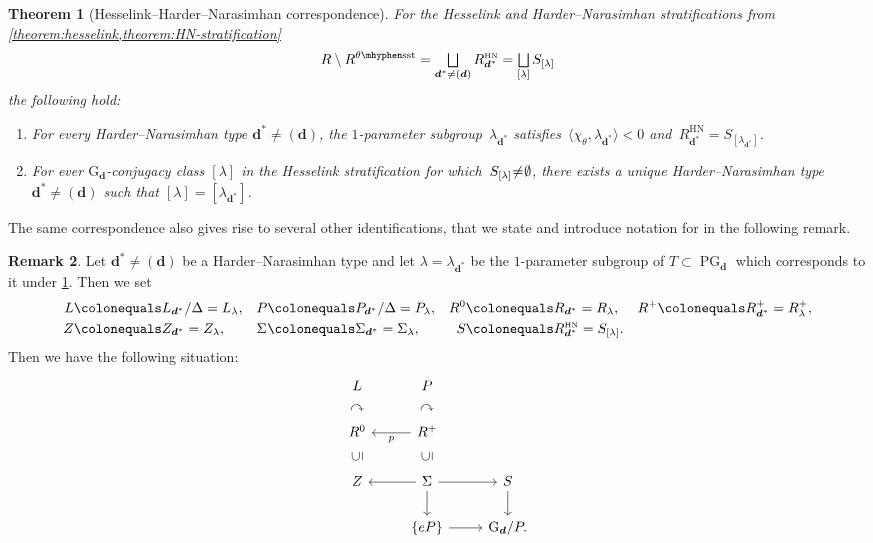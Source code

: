 \documentclass[JEP,XML,SOM,Unicode,NoEqCountersInSection,published]{cedram}
\let\oldbigsqcup\bigsqcup
\renewcommand{\bigsqcup}{\mathop{\textstyle\oldbigsqcup}\displaylimits}
\theoremstyle{plain}
\newtheorem{theorem}{Theorem}[section]
\theoremstyle{definition}
\newtheorem{remark}[theorem]{Remark}
\DeclareMathOperator\PG{PG}
\newcommand\blade[1][]{\Sigma_{#1}}
\newcommand\group[1][\tuple{d}]{\mathrm{G}_{#1}}
\newcommand\HN{\ensuremath{{\scriptscriptstyle\mathrm{HN}}}}
\newcommand\semistable{\ensuremath{\mhyphen\mathrm{sst}}}
\newcommand\tuple[1]{\ensuremath{{\boldsymbol{#1}}}}
\begin{document}
\begin{theorem}[Hesselink--Harder--Narasimhan correspondence]
\label{theorem:HN=hesselink}
For the Hesselink and Harder--Nara\-sim\-han stratifications
from \cref{theorem:hesselink,theorem:HN-stratification}
\begin{equation*}
R \setminus R^{\theta\semistable} = \bigsqcup_{\tuple{d}^* \neq (\tuple{d})} R_{\tuple{d}^*}^{\HN} = \bigsqcup_{[\lambda]} S_{[\lambda]}
\end{equation*}
the following hold:
\begin{enumerate}
\item For every Harder--Narasimhan type $\tuple{d}^* \neq (\tuple{d})$,
the $1$-parameter subgroup~$\lambda_{\tuple{d}^*}$
satisfies~$\langle \chi_\theta,\lambda_{\tuple{d}^*} \rangle < 0$
and~$R_{\tuple{d}^*}^{\HN} = S_{[\lambda_{\tuple{d}^*}]}$.
\item For ever ${\group}$-conjugacy class $[\lambda]$ in the Hesselink stratification for which~\hbox{$S_{[\lambda]} \mkern-4mu\neq\mkern-4mu \emptyset$},
there exists a unique Harder--Narasimhan type $\tuple{d}^* \neq (\tuple{d})$
such that $[\lambda] = [\lambda_{\tuple{d}^*}]$.
\end{enumerate}
\end{theorem}
The same correspondence also gives rise to several other identifications,
that we state and introduce notation for in the following remark.
\begin{remark}
\label{remark:technicalities-and-abbreviations-HN-Hesselink-equivalence}
Let $\tuple{d}^* \neq (\tuple{d})$ be a Harder--Narasimhan type
and let $\lambda = \lambda_{\tuple{d}^*}$ be the $1$-parameter subgroup of $T\subset\PG_{\tuple{d}}$
which corresponds to it under \cref{theorem:HN=hesselink}.
Then we set
\begin{align*}
L &\colonequals L_{\tuple{d}^*}/\Delta = L_\lambda,&
P &\colonequals P_{\tuple{d}^*}/\Delta = P_\lambda,&
R^0 &\colonequals R_{\tuple{d}^*} = R_\lambda, &
R^+ &\colonequals R_{\tuple{d}^*}^+ = R_\lambda^+,\\
Z &\colonequals Z_{\tuple{d}^*} = Z_\lambda,&
\blade &\colonequals \blade[\tuple{d}^*] = \blade[\lambda], &
S &\colonequals R_{\tuple{d}^*}^{\HN} = S_{[\lambda]}.
\end{align*}
Then we have the following situation:
\begin{equation*}
\begin{tikzcd}
L & P \\[-1.5em]
\curvearrowright & \curvearrowright \\[-1.5em]
R^0 & R^+ \arrow{l}{p} \\[-1.5em]
\text{\rotatebox[origin=c]{90}{$\subseteq$}} & \text{\rotatebox[origin=c]{90}{$\subseteq$}} \\[-1.5em]
Z & \Sigma \arrow{l}{} \arrow{r}{} \arrow{d}{} & S \arrow{d}{} \\
& \{eP\} \arrow{r}{} & {\group}/P.
\end{tikzcd}
\end{equation*}
\end{remark}
\end{document}
